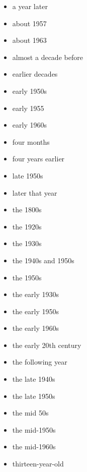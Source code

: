 \documentclass[12pt,a4paper]{article}
\begin{document}
\begin{itemize}
  \item a year later
  \item about 1957
  \item about 1963
  \item almost a decade before
  \item earlier decades
  \item early 1950s
  \item early 1955
  \item early 1960s
  \item four months
  \item four years earlier
  \item late 1950s
  \item later that year
  \item the 1800s
  \item the 1920s
  \item the 1930s
  \item the 1940s and 1950s
  \item the 1950s
  \item the early 1930s
  \item the early 1950s
  \item the early 1960s
  \item the early 20th century
  \item the following year
  \item the late 1940s
  \item the late 1950s
  \item the mid 50s
  \item the mid-1950s
  \item the mid-1960s
  \item thirteen-year-old
\end{itemize}
\end{document}
